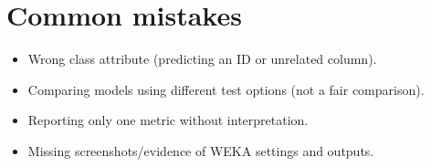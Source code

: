 \documentclass[11pt]{article}
\begin{document}
\section{Common mistakes}
\begin{itemize}[leftmargin=*]
  \item Wrong class attribute (predicting an ID or unrelated column).
  \item Comparing models using different test options (not a fair comparison).
  \item Reporting only one metric without interpretation.
  \item Missing screenshots/evidence of WEKA settings and outputs.
\end{itemize}

\notesources{\AIMLLabSources}
\end{document}
